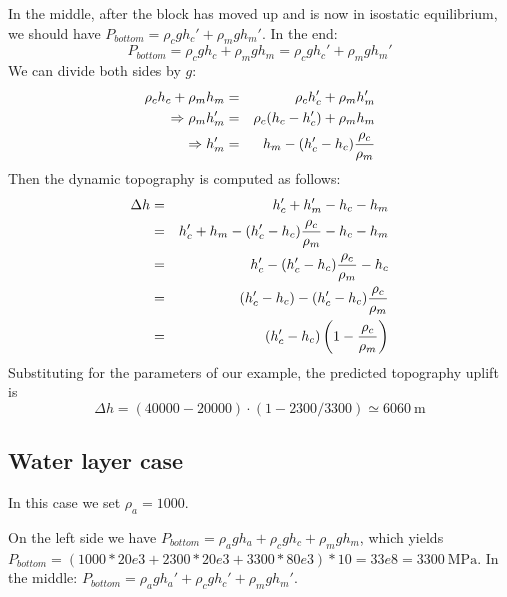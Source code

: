 In the middle, after the block has moved up and is now in isostatic equilibrium, 
we should have $P_{bottom}=\rho_c g h_c' + \rho_m g h_m'$.
In the end:
\[
P_{bottom}=\rho_c g h_c + \rho_m g h_m = \rho_c g h_c' + \rho_m g h_m'
\]
We can divide both sides by $g$:
\begin{eqnarray}
\rho_c  h_c + \rho_m  h_m &=& \rho_c  h_c' + \rho_m  h_m' \nonumber\\
\Rightarrow \rho_m h_m'&=& \rho_c(h_c-h_c') + \rho_m h_m  \nonumber\\
\Rightarrow h_m' &=& h_m-(h_c'-h_c)\frac{\rho_c}{\rho_m} \nonumber
\end{eqnarray}
Then the dynamic topography is computed as follows:
\begin{eqnarray}
\Delta h 
&=& h_c' + h_m' - h_c - h_m \nonumber\\
&=& h_c' + h_m -(h_c'-h_c)\frac{\rho_c}{\rho_m} -h_c - h_m \nonumber\\
&=& h_c'  -(h_c'-h_c)\frac{\rho_c}{\rho_m} -h_c  \nonumber\\
&=& (h_c'-h_c)  -(h_c'-h_c)\frac{\rho_c}{\rho_m}   \nonumber\\
&=& (h_c'-h_c) \left(1 -\frac{\rho_c}{\rho_m} \right) 
\end{eqnarray}
Substituting for the parameters of our example, the predicted topography uplift is 
\[
\Delta h = (40000-20000)\cdot (1-2300/3300) \simeq 6060~\si{\meter}
\]


\subsection*{Water layer case}

In this case we set $\rho_a=1000$.

On the left side we have $P_{bottom}=\rho_a g h_a + \rho_c g h_c + \rho_m g h_m$, which 
yields $P_{bottom}=(1000*20e3 + 2300*20e3 + 3300*80e3)*10 = 33e8=3300~\si{\mega\pascal}$.
In the middle:
$P_{bottom}=\rho_a g h_a' + \rho_c g h_c' + \rho_m g h_m'$.


